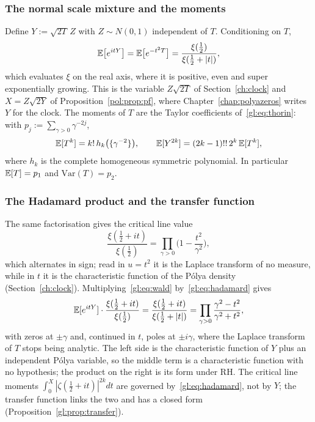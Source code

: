 \subsubsection{The normal scale mixture and the moments}

Define $Y := \sqrt{2T}\,Z$ with $Z \sim N(0,1)$ independent of $T$. Conditioning on $T$,
\begin{equation}\label{gl:eq:wald}
\mathbb{E}\big[e^{itY}\big] = \mathbb{E}\big[e^{-t^2T}\big] = \frac{\xi(\tfrac12)}{\xi(\tfrac12+|t|)},
\end{equation}
which evaluates $\xi$ on the real axis, where it is positive, even and super exponentially growing. This is the variable $Z\sqrt{2T}$ of Section~\ref{ch:clock} and $X=Z\sqrt{2Y}$ of Proposition~\ref{pol:prop:pf}, where Chapter~\ref{chap:polyazeros} writes $Y$ for the clock. The moments of $T$ are the Taylor coefficients of~\eqref{gl:eq:thorin}: with $p_j := \sum_{\gamma>0}\gamma^{-2j}$,
\begin{equation}\label{gl:eq:moments}
\mathbb{E}[T^k] = k!\,h_k\big(\{\gamma^{-2}\}\big),\qquad \mathbb{E}[Y^{2k}] = (2k-1)!!\,2^k\,\mathbb{E}[T^k],
\end{equation}
where $h_k$ is the complete homogeneous symmetric polynomial. In particular $\mathbb{E}[T] = p_1$ and $\mathrm{Var}(T) = p_2$.

\subsubsection{The Hadamard product and the transfer function}

The same factorisation gives the critical line value
\begin{equation}\label{gl:eq:hadamard}
\frac{\xi(\tfrac12+it)}{\xi(\tfrac12)} = \prod_{\gamma>0}\Big(1-\frac{t^2}{\gamma^2}\Big),
\end{equation}
which alternates in sign; read in $u=t^2$ it is the Laplace transform of no measure, while in $t$ it is the characteristic function of the P\'olya density (Section~\ref{ch:clock}). Multiplying~\eqref{gl:eq:wald} by~\eqref{gl:eq:hadamard} gives
\begin{equation}\label{gl:eq:transfer}
\mathbb{E}[e^{itY}]\cdot\frac{\xi(\tfrac12+it)}{\xi(\tfrac12)}
= \frac{\xi(\tfrac12+it)}{\xi(\tfrac12+|t|)}
= \prod_{\gamma>0}\frac{\gamma^2-t^2}{\gamma^2+t^2},
\end{equation}
with zeros at $\pm\gamma$ and, continued in $t$, poles at $\pm i\gamma$, where the Laplace transform of $T$ stops being analytic. The left side is the characteristic function of $Y$ plus an independent P\'olya variable, so the middle term is a characteristic function with no hypothesis; the product on the right is its form under RH. The critical line moments $\int_0^X|\zeta(\tfrac12+it)|^{2k}dt$ are governed by~\eqref{gl:eq:hadamard}, not by $Y$; the transfer function links the two and has a closed form (Proposition~\ref{gl:prop:transfer}).

